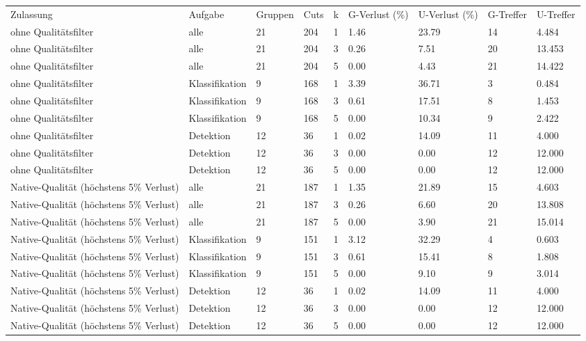 \begin{tabular}{lllllllll}
Zulassung & Aufgabe & Gruppen & Cuts & k & G-Verlust (\%) & U-Verlust (\%) & G-Treffer & U-Treffer \\
ohne Qualitätsfilter & alle & 21 & 204 & 1 & 1.46 & 23.79 & 14 & 4.484 \\
ohne Qualitätsfilter & alle & 21 & 204 & 3 & 0.26 & 7.51 & 20 & 13.453 \\
ohne Qualitätsfilter & alle & 21 & 204 & 5 & 0.00 & 4.43 & 21 & 14.422 \\
ohne Qualitätsfilter & Klassifikation & 9 & 168 & 1 & 3.39 & 36.71 & 3 & 0.484 \\
ohne Qualitätsfilter & Klassifikation & 9 & 168 & 3 & 0.61 & 17.51 & 8 & 1.453 \\
ohne Qualitätsfilter & Klassifikation & 9 & 168 & 5 & 0.00 & 10.34 & 9 & 2.422 \\
ohne Qualitätsfilter & Detektion & 12 & 36 & 1 & 0.02 & 14.09 & 11 & 4.000 \\
ohne Qualitätsfilter & Detektion & 12 & 36 & 3 & 0.00 & 0.00 & 12 & 12.000 \\
ohne Qualitätsfilter & Detektion & 12 & 36 & 5 & 0.00 & 0.00 & 12 & 12.000 \\
Native-Qualität (höchstens 5\% Verlust) & alle & 21 & 187 & 1 & 1.35 & 21.89 & 15 & 4.603 \\
Native-Qualität (höchstens 5\% Verlust) & alle & 21 & 187 & 3 & 0.26 & 6.60 & 20 & 13.808 \\
Native-Qualität (höchstens 5\% Verlust) & alle & 21 & 187 & 5 & 0.00 & 3.90 & 21 & 15.014 \\
Native-Qualität (höchstens 5\% Verlust) & Klassifikation & 9 & 151 & 1 & 3.12 & 32.29 & 4 & 0.603 \\
Native-Qualität (höchstens 5\% Verlust) & Klassifikation & 9 & 151 & 3 & 0.61 & 15.41 & 8 & 1.808 \\
Native-Qualität (höchstens 5\% Verlust) & Klassifikation & 9 & 151 & 5 & 0.00 & 9.10 & 9 & 3.014 \\
Native-Qualität (höchstens 5\% Verlust) & Detektion & 12 & 36 & 1 & 0.02 & 14.09 & 11 & 4.000 \\
Native-Qualität (höchstens 5\% Verlust) & Detektion & 12 & 36 & 3 & 0.00 & 0.00 & 12 & 12.000 \\
Native-Qualität (höchstens 5\% Verlust) & Detektion & 12 & 36 & 5 & 0.00 & 0.00 & 12 & 12.000 \\
\end{tabular}
